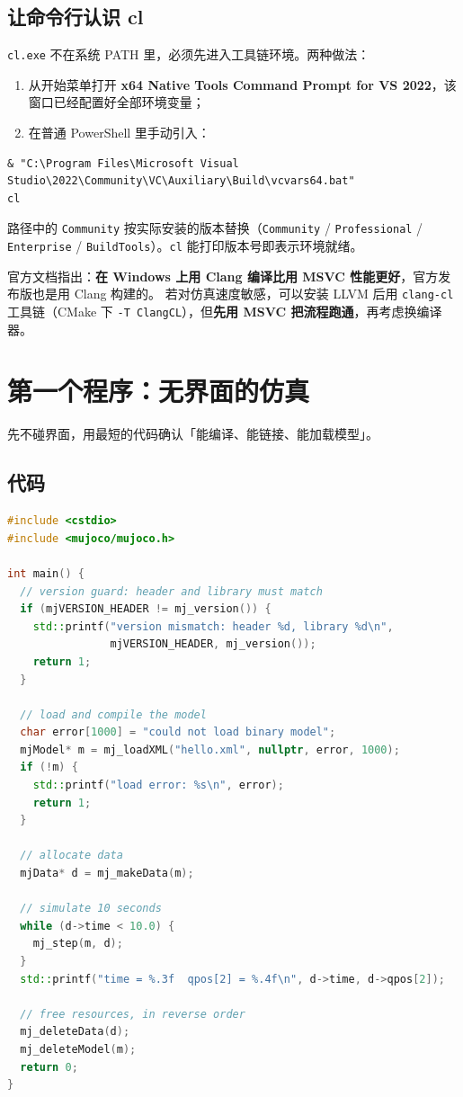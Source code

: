 \subsection{让命令行认识 cl}

\texttt{cl.exe} 不在系统 PATH 里，必须先进入工具链环境。两种做法：

\begin{enumerate}
	\item 从开始菜单打开 \textbf{x64 Native Tools Command Prompt for VS 2022}，该窗口已经配置好全部环境变量；
	\item 在普通 PowerShell 里手动引入：
\end{enumerate}

\begin{lstlisting}[style=shell]
& "C:\Program Files\Microsoft Visual Studio\2022\Community\VC\Auxiliary\Build\vcvars64.bat"
cl
\end{lstlisting}

路径中的 \texttt{Community} 按实际安装的版本替换（\texttt{Community} / \texttt{Professional} / \texttt{Enterprise} / \texttt{BuildTools}）。\texttt{cl} 能打印版本号即表示环境就绪。

\begin{tipbox}[官方性能提示]
	官方文档指出：\textbf{在 Windows 上用 Clang 编译比用 MSVC 性能更好}，官方发布版也是用 Clang 构建的。
	若对仿真速度敏感，可以安装 LLVM 后用 \texttt{clang-cl} 工具链（CMake 下 \texttt{-T ClangCL}），但\textbf{先用 MSVC 把流程跑通}，再考虑换编译器。
\end{tipbox}

\section{第一个程序：无界面的仿真}

先不碰界面，用最短的代码确认「能编译、能链接、能加载模型」。

\subsection{代码}

\begin{lstlisting}[style=code, language=C++]
#include <cstdio>
#include <mujoco/mujoco.h>

int main() {
  // version guard: header and library must match
  if (mjVERSION_HEADER != mj_version()) {
    std::printf("version mismatch: header %d, library %d\n",
                mjVERSION_HEADER, mj_version());
    return 1;
  }

  // load and compile the model
  char error[1000] = "could not load binary model";
  mjModel* m = mj_loadXML("hello.xml", nullptr, error, 1000);
  if (!m) {
    std::printf("load error: %s\n", error);
    return 1;
  }

  // allocate data
  mjData* d = mj_makeData(m);

  // simulate 10 seconds
  while (d->time < 10.0) {
    mj_step(m, d);
  }
  std::printf("time = %.3f  qpos[2] = %.4f\n", d->time, d->qpos[2]);

  // free resources, in reverse order
  mj_deleteData(d);
  mj_deleteModel(m);
  return 0;
}
\end{lstlisting}

